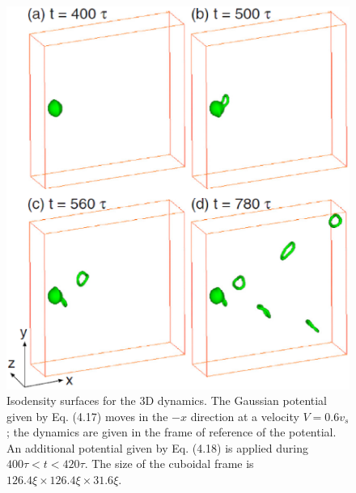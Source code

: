 \documentclass[12pt,a4paper]{report}
\begin{document}
\begin{figure}[htbp]
\begin{center}
\includegraphics[scale=0.55, keepaspectratio]{4-6.eps}
\caption{
Isodensity surfaces for the 3D dynamics.
The Gaussian potential given by Eq. (4.17) moves in the $-x$ direction
at a velocity $V=0.6v_s$; the dynamics are given in the frame of
reference of the potential. An additional potential given by Eq. (4.18)
is applied during $400 \tau < t < 420 \tau$. The size of the cuboidal frame
is $126.4 \xi \times 126.4 \xi \times 31.6 \xi$.
}
\label{FIG:4-6}
\end{center}
\end{figure}
\end{document}
